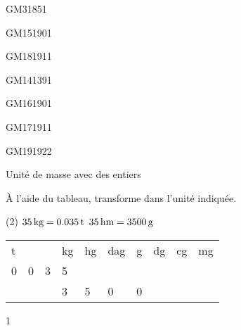 \documentclass[a4paper,11pt]{report}
\begin{document}
\begin{exof}{GM3}{185}{1}
\end{exof}

\begin{exof}{GM15}{190}{1}
\end{exof}

\begin{exof}{GM18}{191}{1}
\end{exof}

\begin{exol}{GM14}{139}{1}
\end{exol}

\begin{exof}{GM16}{190}{1}
\end{exof}

\begin{exof}{GM17}{191}{1}
\end{exof}


\begin{exof}{GM19}{192}{2}
\end{exof}

\begin{resolu}
    {Unité de masse avec des entiers}
    {À l'aide du tableau, transforme dans l'unité indiquée.

\begin{tasks}(2)
    \task $\tunit{35}{\kilo g}= \tunit{0,035}{\tonne}$
    \task $\tunit{35}{\hecto m} = \tunit{3500}{\g}$
    
\end{tasks}
\begin{center}

\begin{tabular}{*{10}{|x{0.9cm}}|}
 \hline
  t & & & kg & hg & dag &g &dg &cg&mg\\   
0 & 0  &3 & 5& & & & & & \\ 
 \hline

 &   & & 3&5 &0 &0 & & & \\ 
\hline

\end{tabular} 
\end{center}
    
    }
{1}
\end{resolu}
\end{document}
